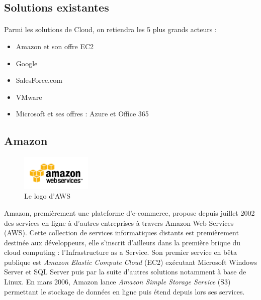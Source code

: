 \documentclass[a4paper,12pt]{report}
\begin{document}
\begin{onehalfspace}
	
	\section{Solutions existantes}
	
	\paragraph*{}
	Parmi les solutions de Cloud, on retiendra les 5 plus grands acteurs : 
	\begin{itemize}
		\item Amazon et son offre EC2
		\item Google
		\item SalesForce.com
		\item VMware
		\item Microsoft et ses offres : Azure et Office 365
	\end{itemize}
	
	
	\subsection{Amazon}
		\begin{figure}
			\centering
			\includegraphics[width=0.3\textwidth]{aws.png} 
			\caption{Le logo d'AWS}
		\end{figure}

Amazon, premièrement une plateforme d'e-commerce, propose depuis juillet 2002 des services en ligne à d'autres entreprises à travers Amazon Web Services (AWS). Cette collection de services informatiques distants est premièrement destinée aux développeurs, elle s'inscrit d'ailleurs dans la première brique du cloud computing : l'Infrastructure as a Service. Son premier service en bêta publique est \textit{Amazon Elastic Compute Cloud} (EC2) exécutant Microsoft Windows Server et SQL Server puis par la suite d'autres solutions notamment à base de Linux.
 En mars 2006, Amazon lance \textit{Amazon Simple Storage Service} (S3) permettant le stockage de données en ligne puis étend depuis lors ses services.
	

\end{onehalfspace}
\end{document}
